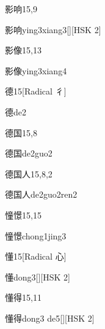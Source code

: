 \begin{entry}{影响}{15,9}
  \begin{phonetics}{影响}{ying3xiang3}[][HSK 2]
  \end{phonetics}
\end{entry}

\begin{entry}{影像}{15,13}
  \begin{phonetics}{影像}{ying3xiang4}
  \end{phonetics}
\end{entry}

\begin{entry}{德}{15}[Radical 彳]
  \begin{phonetics}{德}{de2}
  \end{phonetics}
\end{entry}

\begin{entry}{德国}{15,8}
  \begin{phonetics}{德国}{de2guo2}
  \end{phonetics}
\end{entry}

\begin{entry}{德国人}{15,8,2}
  \begin{phonetics}{德国人}{de2guo2ren2}
  \end{phonetics}
\end{entry}

\begin{entry}{憧憬}{15,15}
  \begin{phonetics}{憧憬}{chong1jing3}
  \end{phonetics}
\end{entry}

\begin{entry}{懂}{15}[Radical 心]
  \begin{phonetics}{懂}{dong3}[][HSK 2]
  \end{phonetics}
\end{entry}

\begin{entry}{懂得}{15,11}
  \begin{phonetics}{懂得}{dong3 de5}[][HSK 2]
  \end{phonetics}
\end{entry}

